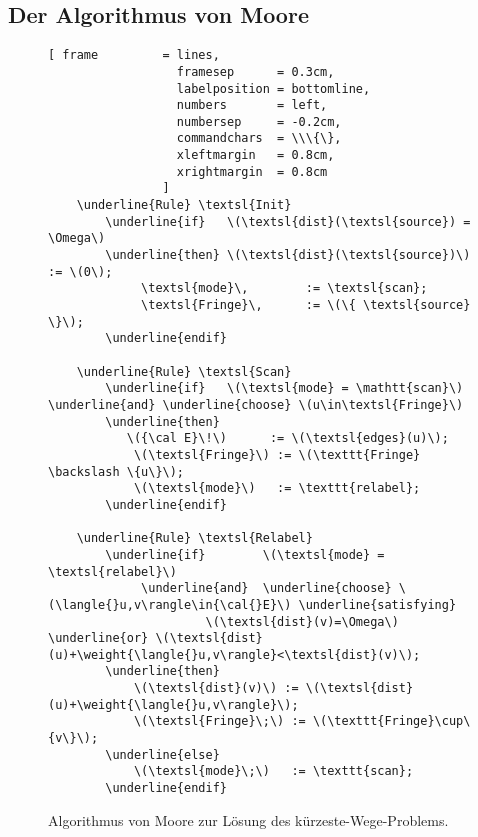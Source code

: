 \subsection{Der Algorithmus von Moore}
\begin{figure}[!ht]
  \centering
\begin{Verbatim}[ frame         = lines, 
                  framesep      = 0.3cm, 
                  labelposition = bottomline,
                  numbers       = left,
                  numbersep     = -0.2cm,
                  commandchars  = \\\{\},
                  xleftmargin   = 0.8cm,
                  xrightmargin  = 0.8cm
                ]
    \underline{Rule} \textsl{Init}
        \underline{if}   \(\textsl{dist}(\textsl{source}) = \Omega\)
        \underline{then} \(\textsl{dist}(\textsl{source})\) := \(0\);
             \textsl{mode}\,        := \textsl{scan};
             \textsl{Fringe}\,      := \(\{ \textsl{source} \}\);
        \underline{endif}
        
    \underline{Rule} \textsl{Scan}
        \underline{if}   \(\textsl{mode} = \mathtt{scan}\) \underline{and} \underline{choose} \(u\in\textsl{Fringe}\) 
        \underline{then}
           \({\cal E}\!\)      := \(\textsl{edges}(u)\);
            \(\textsl{Fringe}\) := \(\texttt{Fringe} \backslash \{u\}\);
            \(\textsl{mode}\)   := \texttt{relabel};
        \underline{endif}

    \underline{Rule} \textsl{Relabel}
        \underline{if}        \(\textsl{mode} = \textsl{relabel}\)
             \underline{and}  \underline{choose} \(\langle{}u,v\rangle\in{\cal{}E}\) \underline{satisfying}  
                      \(\textsl{dist}(v)=\Omega\) \underline{or} \(\textsl{dist}(u)+\weight{\langle{}u,v\rangle}<\textsl{dist}(v)\);
        \underline{then}
            \(\textsl{dist}(v)\) := \(\textsl{dist}(u)+\weight{\langle{}u,v\rangle}\);
            \(\textsl{Fringe}\;\) := \(\texttt{Fringe}\cup\{v\}\);
        \underline{else} 
            \(\textsl{mode}\;\)   := \texttt{scan};
        \underline{endif}
\end{Verbatim}
\vspace*{-0.3cm}
  \caption{Algorithmus von Moore zur L\"osung des k\"urzeste-Wege-Problems.}
  \label{fig:rules-moore}
\end{figure} 


